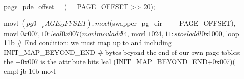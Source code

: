 \documentclass[varwidth=42em,crop]{standalone}
\begin{document}
\begin{gascode}
page_pde_offset = (__PAGE_OFFSET >> 20);

    movl $(pg0 - __PAGE_OFFSET), %
    movl $(swapper_pg_dir - __PAGE_OFFSET), %
    movl $0x007, %
10:
    leal 0x007(%
    movl %
    movl %
    addl $4,%
    movl $1024, %
11:
    stosl
    addl $0x1000,%
    loop 11b
    # End condition: we must map up to and including INIT_MAP_BEYOND_END 
    # bytes beyond the end of our own page tables; the +0x007 is the attribute bits 
    leal (INIT_MAP_BEYOND_END+0x007)(%
    cmpl %
    jb 10b
    movl %
\end{gascode}
\end{document}
